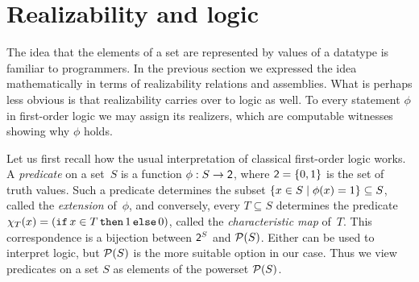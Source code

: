 \chapter{Realizability and logic}
\label{sec:realizability-interpretation}

The idea that the elements of a set are represented by values of a
datatype is familiar to programmers. In the previous section we
expressed the idea mathematically in terms of realizability relations
and assemblies. What is perhaps less obvious is that realizability
carries over to logic as well. To every statement $\phi$ in
first-order logic we may assign its realizers, which are computable
witnesses showing why $\phi$ holds.

Let us first recall how the usual interpretation of classical
first-order logic works. A \emph{predicate} on a set~$S$ is a function
$\phi : S \to \mathsf{2}$, where $\mathsf{2} = \{0, 1\}$ is the set of truth
values. Such a predicate determines the subset $\{x \in S \mid
  \phi(x) = 1\} \subseteq S$, called the \emph{extension} of~$\phi$,
and conversely, every $T \subseteq S$ determines the predicate
$\chi_T(x) = (\mathtt{if}\,x \in T\,\mathtt{then}\,1\,\mathtt{else}\,0)$, called the \emph{characteristic
  map} of~$T$. This correspondence is a bijection between $\mathsf{2}^S$ and
$\mathcal{P}(S)$. Either can be used to interpret logic, but $\mathcal{P}(S)$ is the
more suitable option in our case. Thus we view predicates on a set
$S$ as elements of the powerset $\mathcal{P}(S)$.

